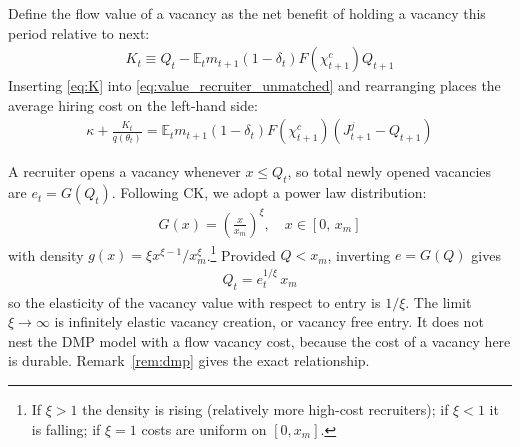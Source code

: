 \documentclass[authoryear, review, 12pt]{elsarticle}
\begin{document}
	Define the flow value of a vacancy as the net benefit of 
	holding a vacancy this period relative to next:
	\begin{align}\label{eq:K}
		K_t \equiv Q_t - 
		\mathbb{E}_t m_{t+1}(1-\delta_t)F(\chi_{t+1}^c)Q_{t+1}
	\end{align}
	Inserting \eqref{eq:K} into \eqref{eq:value_recruiter_unmatched} and rearranging places the 
	average hiring cost on the left-hand side:
	\begin{align}\label{eq:average_hiring_cost}
		\kappa+\frac{K_t}{q(\theta_t)} = 
		\mathbb{E}_t m_{t+1}(1-\delta_t)F(\chi_{t+1}^c)
		(J_{t+1}^j-Q_{t+1})
	\end{align}
	
	A recruiter opens a vacancy whenever $x\leq Q_t$, so total 
	newly opened vacancies are $e_t=G(Q_t)$. Following CK, we 
	adopt a power law distribution:
	\begin{align}
		G(x)=\left(\frac{x}{x_m}\right)^{\xi}, 
		\quad x\in[0,\,x_m]
	\end{align}
	with density $g(x)=\xi x^{\xi-1}/x_m^{\xi}$.\footnote{If 
		$\xi>1$ the density is rising (relatively more high-cost 
		recruiters); if $\xi<1$ it is falling; if $\xi=1$ costs are 
		uniform on $[0,x_m]$.} Provided $Q<x_m$, inverting $e=G(Q)$ 
	gives
	\begin{align}\label{eq:Q}
		Q_t = e_t^{1/\xi}\,x_m
	\end{align}
	so the elasticity of the vacancy value with respect to entry 
	is $1/\xi$. The limit $\xi\to\infty$ is infinitely elastic vacancy creation, or vacancy
	free entry. It does not nest the DMP model with a flow vacancy cost, because the cost of a
	vacancy here is durable. Remark~\ref{rem:dmp} gives the exact relationship.
	
\end{document}

